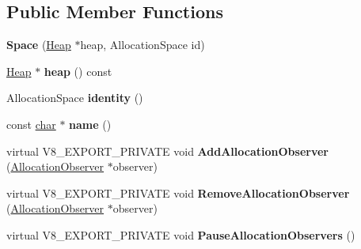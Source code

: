 \subsection*{Public Member Functions}
\begin{DoxyCompactItemize}
\item 
\mbox{\label{classv8_1_1internal_1_1Space_a25c01d5742d602b1b1d8ebdb035f666f}} 
{\bfseries Space} (\mbox{\hyperlink{classv8_1_1internal_1_1Heap}{Heap}} $\ast$heap, Allocation\+Space id)
\item 
\mbox{\label{classv8_1_1internal_1_1Space_ac6225465688c26858b8a5f53fe8c6cb9}} 
\mbox{\hyperlink{classv8_1_1internal_1_1Heap}{Heap}} $\ast$ {\bfseries heap} () const
\item 
\mbox{\label{classv8_1_1internal_1_1Space_a934a26e2755bc4f0d8060cfb3d051cdf}} 
Allocation\+Space {\bfseries identity} ()
\item 
\mbox{\label{classv8_1_1internal_1_1Space_ae5f4e1a282bffe2801b1887ef17f7f6b}} 
const \mbox{\hyperlink{classchar}{char}} $\ast$ {\bfseries name} ()
\item 
\mbox{\label{classv8_1_1internal_1_1Space_aa0e92a1328875808ba0f8aa7c4ed94c2}} 
virtual V8\+\_\+\+E\+X\+P\+O\+R\+T\+\_\+\+P\+R\+I\+V\+A\+TE void {\bfseries Add\+Allocation\+Observer} (\mbox{\hyperlink{classv8_1_1internal_1_1AllocationObserver}{Allocation\+Observer}} $\ast$observer)
\item 
\mbox{\label{classv8_1_1internal_1_1Space_abb4bd10a0085845b3666b96dec3090bd}} 
virtual V8\+\_\+\+E\+X\+P\+O\+R\+T\+\_\+\+P\+R\+I\+V\+A\+TE void {\bfseries Remove\+Allocation\+Observer} (\mbox{\hyperlink{classv8_1_1internal_1_1AllocationObserver}{Allocation\+Observer}} $\ast$observer)
\item 
\mbox{\label{classv8_1_1internal_1_1Space_ab95cabf4a018591c1039d1095026b45e}} 
virtual V8\+\_\+\+E\+X\+P\+O\+R\+T\+\_\+\+P\+R\+I\+V\+A\+TE void {\bfseries Pause\+Allocation\+Observers} ()
\item 
\mbox{\label{classv8_1_1internal_1_1Space_ad69a71f89b17d90e42f54aa6f45def25}} 

\end{DoxyCompactItemize}
